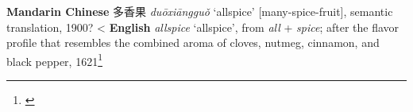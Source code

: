 \begin{etymology}\label{ety:duoxiangguo}
\textbf{Mandarin Chinese} {多香果} \textit{duōxiāngguǒ} `allspice' [many-spice-fruit], semantic translation, 1900?
< \textbf{English} \textit{allspice} `allspice', from \textit{all} + \textit{spice}; after the flavor profile that resembles the combined aroma of cloves, nutmeg, cinnamon, and black pepper, 1621\footnote{\textcite{mdbg}}
\end{etymology}